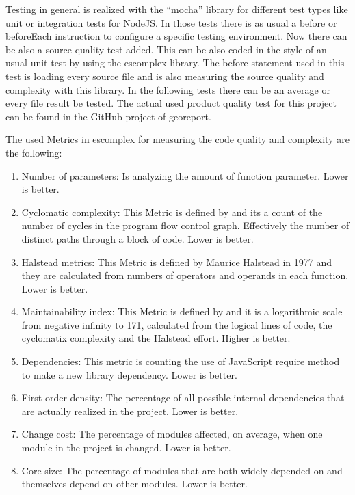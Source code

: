 \documentclass[DIV=calc,paper=a4,fontsize=9pt,twocolumn]{scrartcl}
\begin{document}
Testing in general is realized with the \enquote{mocha} library for different test types like unit or integration tests for NodeJS. In those tests there is as usual a before or beforeEach instruction to configure a specific testing environment. Now there can be also a source quality test added. This can be also coded in the style of an usual unit test by using the escomplex library. The before statement used in this test is loading every source file and is also measuring the source quality and complexity with this library. In the following tests there can be an average or every file result be tested. The actual used product quality test for this project can be found in the GitHub project of georeport.

The used Metrics in escomplex for measuring the code quality and complexity are the following:

\begin{enumerate}
    \item Number of parameters: Is analyzing the amount of function parameter. Lower is better.
    \item Cyclomatic complexity: This Metric is defined by \citet{mccabe1976complexity} and its a count of the number of cycles in the program flow control graph. Effectively the number of distinct paths through a block of code. Lower is better.
    \item Halstead metrics: This Metric is defined by Maurice Halstead in 1977 \citep{zuse2005resolving} and they are calculated from numbers of operators and operands in each function. Lower is better.
    \item Maintainability index: This Metric is defined by \citet{oman1992metrics} and it is a logarithmic scale from negative infinity to 171, calculated from the logical lines of code, the cyclomatix complexity and the Halstead effort. Higher is better.
    \item Dependencies: This metric is counting the use of JavaScript require method to make a new library dependency. Lower is better.
    \item First-order density: The percentage of all possible internal dependencies that are actually realized in the project. Lower is better.
    \item Change cost: The percentage of modules affected, on average, when one module in the project is changed. Lower is better.
    \item Core size: The percentage of modules that are both widely depended on and themselves depend on other modules. Lower is better.
\end{enumerate}
\end{document}

